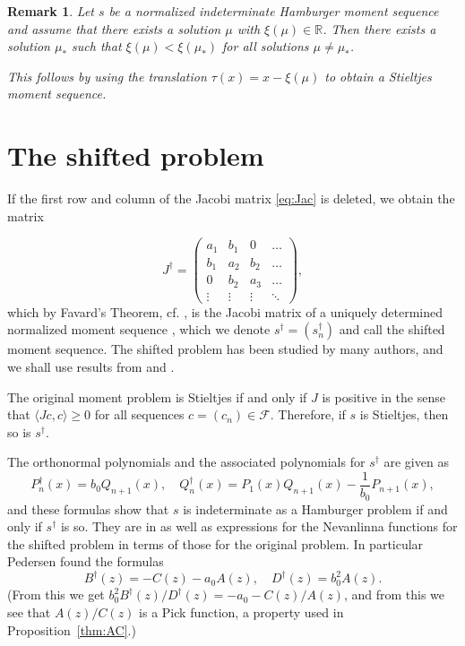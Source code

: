 \documentclass[12pt]{article}
\newtheorem{rem}[thm]{Remark}
\newcommand{\R}{\mathbb{R}}
\def\R{\mathbb{R}}
\begin{document}
\begin{rem}{\rm Let $s$ be a normalized indeterminate Hamburger moment sequence and assume that there exists a solution $\mu$ with $\xi(\mu)\in\R$. Then there exists a solution
$\mu_*$ such that $\xi(\mu)<\xi(\mu_*)$ for all solutions $\mu\neq \mu_*$.

This follows by using the translation $\tau(x)=x-\xi(\mu)$ to obtain a Stieltjes moment sequence.
}
\end{rem}




\section{The shifted problem}
If the first row and column of the Jacobi matrix \eqref{eq:Jac} is deleted, we obtain the
matrix

\begin{equation}\label{eq:Jacdag}
J^\dagger=\begin{pmatrix}
a_1 & b_1 & 0 & \hdots\\
b_1 & a_2 & b_2 & \hdots\\
0 & b_2 & a_3 & \hdots\\
\vdots &\vdots & \vdots & \ddots
\end{pmatrix},
\end{equation}
which by Favard's Theorem, cf. \cite[Theorem 5.14]{Sch}, is the Jacobi matrix of a uniquely determined  normalized moment sequence , which we denote $s^\dagger=(s_n^\dagger)$ and call the shifted moment sequence. The shifted problem has been studied by many authors,  and we shall use results from \cite{B0} and \cite{Pe}.

The original moment problem  is Stieltjes if and only if $J$ is positive in the sense that
$\langle Jc,c\rangle\ge 0$ for all sequences $c=(c_n)\in\mathcal F$.
Therefore, if $s$ is Stieltjes, then so is $s^\dagger$.

The orthonormal polynomials  and the associated polynomials for $s^\dagger$ are given as
\begin{equation}\label{eq:dag1}
P^{\dagger}_n(x)=b_0Q_{n+1}(x),\quad Q^\dagger_n(x)=P_1(x)Q_{n+1}(x)-\frac{1}{b_0}P_{n+1}(x),
\end{equation}
and these formulas show that $s$ is indeterminate as a Hamburger problem if and only if $s^\dagger$ is so. They are in \cite{Pe} as well as expressions for  the Nevanlinna functions
 for the shifted problem in terms of those for the original problem. In particular Pedersen found the formulas
 \begin{equation}\label{eq:BDdag}
 B^\dagger(z)=-C(z)-a_0A(z),\quad D^\dagger(z)=b_0^2A(z).
 \end{equation}
 (From this we  get $b_0^2B^\dagger(z)/D^\dagger(z)=-a_0-C(z)/A(z)$, and from this we see that $A(z)/C(z)$ is a Pick function, a property used in Proposition~\ref{thm:AC}.) 
 
\end{document}
